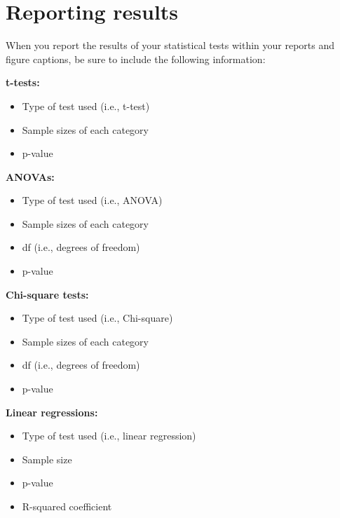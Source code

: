 \documentclass[]{book}
\providecommand{\tightlist}{%
  \setlength{\itemsep}{0pt}\setlength{\parskip}{0pt}}
\begin{document}
\hypertarget{reporting-results}{%
\section*{Reporting results}\label{reporting-results}}

When you report the results of your statistical tests within your reports and figure captions, be sure to include the following information:

\textbf{t-tests:}

\begin{itemize}
\tightlist
\item
  Type of test used (i.e., t-test)\\
\item
  Sample sizes of each category\\
\item
  p-value
\end{itemize}

\textbf{ANOVAs:}

\begin{itemize}
\tightlist
\item
  Type of test used (i.e., ANOVA)\\
\item
  Sample sizes of each category\\
\item
  df (i.e., degrees of freedom)\\
\item
  p-value
\end{itemize}

\textbf{Chi-square tests:}

\begin{itemize}
\tightlist
\item
  Type of test used (i.e., Chi-square)\\
\item
  Sample sizes of each category\\
\item
  df (i.e., degrees of freedom)\\
\item
  p-value
\end{itemize}

\textbf{Linear regressions:}

\begin{itemize}
\tightlist
\item
  Type of test used (i.e., linear regression)\\
\item
  Sample size\\
\item
  p-value\\
\item
  R-squared coefficient
\end{itemize}
\end{document}
